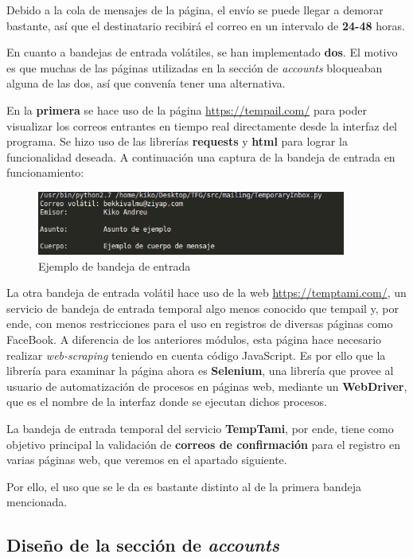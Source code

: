 Debido a la cola de mensajes de la página, el envío se puede llegar a demorar bastante, así que el destinatario recibirá el correo en un intervalo de \textbf{24-48} horas.

En cuanto a bandejas de entrada volátiles, se han implementado \textbf{dos}. El motivo es que muchas de las páginas utilizadas en la sección de \textit{accounts} bloqueaban alguna de las dos, así que convenía tener una alternativa.

En la \textbf{primera} se hace uso de la página \url{https://tempail.com/} para poder visualizar los correos entrantes en tiempo real directamente desde la interfaz del programa. Se hizo uso de las librerías \textbf{requests} y \textbf{html} para lograr la funcionalidad deseada. A continuación una captura de la bandeja de entrada en funcionamiento:

\begin{figure}[H]
	\centerline{
		\mbox{\includegraphics[width=4.00in]{images/inbox1.png}}
	}
	\caption{Ejemplo de bandeja de entrada}
	\label{fig:tempail_inbox}
\end{figure}

La otra bandeja de entrada volátil hace uso de la web \url{https://temptami.com/}, un servicio de bandeja de entrada temporal algo menos conocido que tempail y, por ende, con menos restricciones para el uso en registros de diversas páginas como FaceBook. A diferencia de los anteriores módulos, esta página hace necesario realizar \textit{web-scraping} teniendo en cuenta código JavaScript. Es por ello que la librería para examinar la página ahora es \textbf{Selenium}, una librería que provee al usuario de automatización de procesos en páginas web, mediante un \textbf{WebDriver}, que es el nombre de la interfaz donde se ejecutan dichos procesos. 

La bandeja de entrada temporal del servicio \textbf{TempTami}, por ende, tiene como objetivo principal la validación de \textbf{correos de confirmación} para el registro en varias páginas web, que veremos en el apartado siguiente. 

Por ello, el uso que se le da es bastante distinto al de la primera bandeja mencionada.

\subsection{Diseño de la sección de \textit{accounts}}

